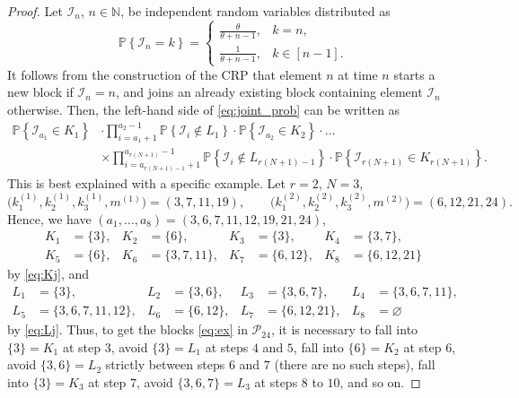 \documentclass[11pt]{article}
\newcommand{\N}{\mathbb{N}}
\renewcommand{\P}[1]{\mathbb{P}{\left\{#1\right\}}}
\newcommand{\1}[1][]{
	\ifx&#1&\mathds{1}
	\else\mathds{1}\left\{#1\right\}\fi}
\newcommand{\Pc}{\mathcal{P}}
\newcommand{\Ic}{\mathcal{I}}
\theoremstyle{definition}
\theoremstyle{remark}
\numberwithin{equation}{section}
\begin{document}
\begin{proof}
		Let $\Ic_n$, $n\in\N$, be independent random variables distributed as
		\begin{equation}
			\label{eq:Idist}
			\P{\Ic_n = k} = \begin{cases}
				\frac{\theta}{\theta + n - 1}, & k = n, \\
				\frac{1}{\theta + n - 1}, & k \in [n-1].
			\end{cases}
		\end{equation}
		It follows from the construction of the CRP that element $n$ at time $n$ starts a new block if $\Ic_n=n$,
		and joins an already existing block containing element $\Ic_n$ otherwise.
		Then, the left-hand side of \eqref{eq:joint_prob} can be written as
		\begin{equation}
			\begin{aligned}
				\label{eq:joint_prob_expanded}
				\P{\Ic_{a_1}\in K_1}&\cdot\!\!\prod_{i={a_1+1}}^{a_2 - 1}\P{\Ic_i \notin L_1}\cdot\P{\Ic_{a_2}\in K_2}\cdot\ldots\\&\times\!\! \prod_{i=a_{r(N+1)-1}+1}^{a_{r(N+1)}-1}\!\!\P{\Ic_i
					\notin L_{r(N+1)-1}}\cdot\P{\Ic_{r(N+1)} \in K_{r(N+1)}}.
			\end{aligned}
		\end{equation}
		This is best explained with a specific example. Let $r=2$, $N=3$,
		\begin{equation}
			\label{eq:ex}
			\bigl(k_1^{(1)},k_2^{(1)},k_3^{(1)},m^{(1)}\bigr) = (3,7,11,19),\qquad
			\bigl(k_1^{(2)},k_2^{(2)},k_3^{(2)},m^{(2)}\bigr) = (6,12,21,24).
		\end{equation}
		Hence, we have $(a_1,\ldots,a_8)=(3,6,7,11,12,19,21,24)$,
		\begin{equation*}
			\begin{aligned}
				K_1 &= \{3\}, & K_2 &= \{6\}, & K_3 &= \{3\}, & K_4 &= \{3,7\}, \\
				K_5 &= \{6\}, & K_6 &= \{3,7,11\}, & K_7 &= \{6,12\}, & K_8 &= \{6,12,21\}
			\end{aligned}
		\end{equation*}
		by \eqref{eq:Kj}, and
		\begin{equation*}
			\begin{aligned}
				L_1 &= \{3\}, & L_2 &= \{3,6\}, & L_3 &= \{3,6,7\}, & L_4 &= \{3,6,7,11\}, \\
				L_5 &= \{3,6,7,11,12\}, & L_6 &= \{6,12\}, & L_7 &= \{6,12,21\}, & L_8 &= \varnothing
			\end{aligned}
		\end{equation*}
		by \eqref{eq:Lj}.
		Thus, to get the blocks \eqref{eq:ex} in $\Pc_{24}$, it is necessary to fall into $\{3\} = K_1$ at step $3$,
		avoid $\{3\} = L_1$ at steps $4$ and $5$, fall into $\{6\} = K_2$ at step $6$, avoid $\{3,6\} = L_2$
		strictly between steps $6$ and $7$ (there are no such steps), fall into $\{3\} = K_3$ at step $7$,
		avoid $\{3,6,7\}=L_3$ at steps $8$ to $10$, and so on.    
		

\end{proof}
\end{document}
